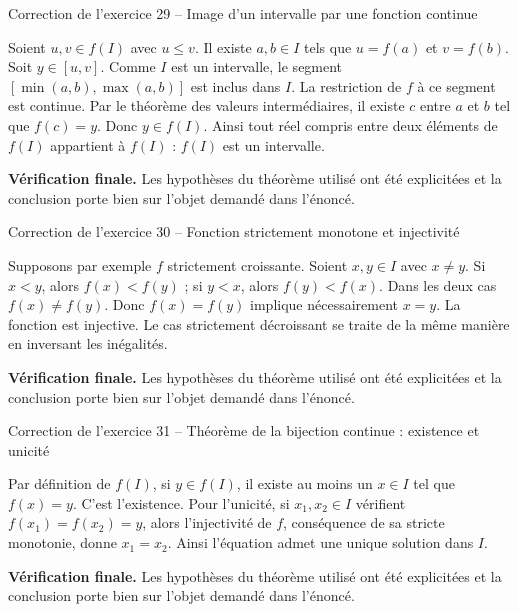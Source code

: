 \documentclass[11pt,a4paper]{article}
\begin{document}
\begin{corrbox}{Correction de l'exercice 29 -- Image d'un intervalle par une fonction continue}

Soient $u,v\in f(I)$ avec $u\leq v$. Il existe $a,b\in I$ tels que $u=f(a)$ et $v=f(b)$. Soit $y\in[u,v]$. Comme $I$ est un intervalle, le segment $[\min(a,b),\max(a,b)]$ est inclus dans $I$. La restriction de $f$ à ce segment est continue. Par le théorème des valeurs intermédiaires, il existe $c$ entre $a$ et $b$ tel que $f(c)=y$. Donc $y\in f(I)$. Ainsi tout réel compris entre deux éléments de $f(I)$ appartient à $f(I)$ : $f(I)$ est un intervalle.

\medskip
\textbf{Vérification finale.} Les hypothèses du théorème utilisé ont été explicitées et la conclusion porte bien sur l'objet demandé dans l'énoncé.
\end{corrbox}


\begin{corrbox}{Correction de l'exercice 30 -- Fonction strictement monotone et injectivité}

Supposons par exemple $f$ strictement croissante. Soient $x,y\in I$ avec $x\neq y$. Si $x<y$, alors $f(x)<f(y)$ ; si $y<x$, alors $f(y)<f(x)$. Dans les deux cas $f(x)\neq f(y)$. Donc $f(x)=f(y)$ implique nécessairement $x=y$. La fonction est injective. Le cas strictement décroissant se traite de la même manière en inversant les inégalités.

\medskip
\textbf{Vérification finale.} Les hypothèses du théorème utilisé ont été explicitées et la conclusion porte bien sur l'objet demandé dans l'énoncé.
\end{corrbox}


\begin{corrbox}{Correction de l'exercice 31 -- Théorème de la bijection continue : existence et unicité}

Par définition de $f(I)$, si $y\in f(I)$, il existe au moins un $x\in I$ tel que $f(x)=y$. C'est l'existence. Pour l'unicité, si $x_1,x_2\in I$ vérifient $f(x_1)=f(x_2)=y$, alors l'injectivité de $f$, conséquence de sa stricte monotonie, donne $x_1=x_2$. Ainsi l'équation admet une unique solution dans $I$.

\medskip
\textbf{Vérification finale.} Les hypothèses du théorème utilisé ont été explicitées et la conclusion porte bien sur l'objet demandé dans l'énoncé.
\end{corrbox}
\end{document}
